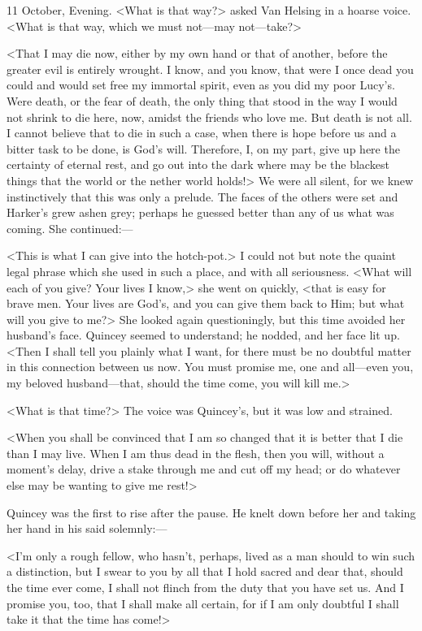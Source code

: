 \begin{diary}{11 October, Evening.}
<What is that way?> asked Van Helsing in a hoarse voice. <What is that way, which we must not—may not—take?>

<That I may die now, either by my own hand or that of another, before the greater evil is entirely wrought. I know, and you know, that were I once dead you could and would set free my immortal spirit, even as you did my poor Lucy's. Were death, or the fear of death, the only thing that stood in the way I would not shrink to die here, now, amidst the friends who love me. But death is not all. I cannot believe that to die in such a case, when there is hope before us and a bitter task to be done, is God's will. Therefore, I, on my part, give up here the certainty of eternal rest, and go out into the dark where may be the blackest things that the world or the nether world holds!> We were all silent, for we knew instinctively that this was only a prelude. The faces of the others were set and Harker's grew ashen grey; perhaps he guessed better than any of us what was coming. She continued:—

<This is what I can give into the hotch-pot.> I could not but note the quaint legal phrase which she used in such a place, and with all seriousness. <What will each of you give? Your lives I know,> she went on quickly, <that is easy for brave men. Your lives are God's, and you can give them back to Him; but what will you give to me?> She looked again questioningly, but this time avoided her husband's face. Quincey seemed to understand; he nodded, and her face lit up. <Then I shall tell you plainly what I want, for there must be no doubtful matter in this connection between us now. You must promise me, one and all—even you, my beloved husband—that, should the time come, you will kill me.>

<What is that time?> The voice was Quincey's, but it was low and strained.

<When you shall be convinced that I am so changed that it is better that I die than I may live. When I am thus dead in the flesh, then you will, without a moment's delay, drive a stake through me and cut off my head; or do whatever else may be wanting to give me rest!>

Quincey was the first to rise after the pause. He knelt down before her and taking her hand in his said solemnly:—

<I'm only a rough fellow, who hasn't, perhaps, lived as a man should to win such a distinction, but I swear to you by all that I hold sacred and dear that, should the time ever come, I shall not flinch from the duty that you have set us. And I promise you, too, that I shall make all certain, for if I am only doubtful I shall take it that the time has come!>


\end{diary}
